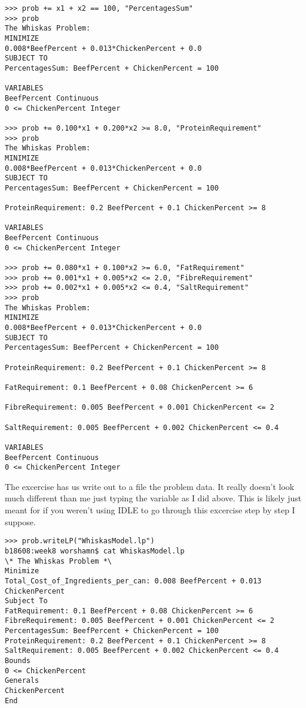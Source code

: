 \documentclass[10pt]{article}
\begin{document}
\begin{verbatim}
>>> prob += x1 + x2 == 100, "PercentagesSum"
>>> prob
The Whiskas Problem:
MINIMIZE
0.008*BeefPercent + 0.013*ChickenPercent + 0.0
SUBJECT TO
PercentagesSum: BeefPercent + ChickenPercent = 100

VARIABLES
BeefPercent Continuous
0 <= ChickenPercent Integer

>>> prob += 0.100*x1 + 0.200*x2 >= 8.0, "ProteinRequirement"
>>> prob
The Whiskas Problem:
MINIMIZE
0.008*BeefPercent + 0.013*ChickenPercent + 0.0
SUBJECT TO
PercentagesSum: BeefPercent + ChickenPercent = 100

ProteinRequirement: 0.2 BeefPercent + 0.1 ChickenPercent >= 8

VARIABLES
BeefPercent Continuous
0 <= ChickenPercent Integer

>>> prob += 0.080*x1 + 0.100*x2 >= 6.0, "FatRequirement"
>>> prob += 0.001*x1 + 0.005*x2 <= 2.0, "FibreRequirement"
>>> prob += 0.002*x1 + 0.005*x2 <= 0.4, "SaltRequirement"
>>> prob
The Whiskas Problem:
MINIMIZE
0.008*BeefPercent + 0.013*ChickenPercent + 0.0
SUBJECT TO
PercentagesSum: BeefPercent + ChickenPercent = 100

ProteinRequirement: 0.2 BeefPercent + 0.1 ChickenPercent >= 8

FatRequirement: 0.1 BeefPercent + 0.08 ChickenPercent >= 6

FibreRequirement: 0.005 BeefPercent + 0.001 ChickenPercent <= 2

SaltRequirement: 0.005 BeefPercent + 0.002 ChickenPercent <= 0.4

VARIABLES
BeefPercent Continuous
0 <= ChickenPercent Integer
\end{verbatim}
The excercise has us write out to a file the problem data. It really doesn't look much different than me just typing the variable as I did above. This is likely just meant for if you weren't using IDLE to go through this excercise step by step I suppose. 
\begin{verbatim}
>>> prob.writeLP("WhiskasModel.lp")
b18608:week8 worshamn$ cat WhiskasModel.lp 
\* The Whiskas Problem *\
Minimize
Total_Cost_of_Ingredients_per_can: 0.008 BeefPercent + 0.013 ChickenPercent
Subject To
FatRequirement: 0.1 BeefPercent + 0.08 ChickenPercent >= 6
FibreRequirement: 0.005 BeefPercent + 0.001 ChickenPercent <= 2
PercentagesSum: BeefPercent + ChickenPercent = 100
ProteinRequirement: 0.2 BeefPercent + 0.1 ChickenPercent >= 8
SaltRequirement: 0.005 BeefPercent + 0.002 ChickenPercent <= 0.4
Bounds
0 <= ChickenPercent
Generals
ChickenPercent
End
\end{verbatim}
\end{document}
